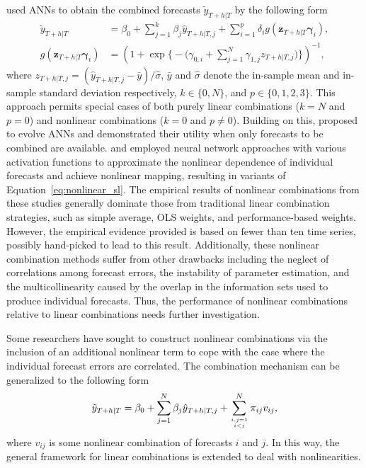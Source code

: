 \documentclass[11pt]{article}
\begin{document}
\citet{Donaldson1996-um} used ANNs to obtain the combined forecasts $\tilde{y}_{T+h|T}$ by the following form
\begin{align}
  \tilde{y}_{T+h|T} & =
    \beta_{0}+\sum_{j=1}^{k} \beta_{j} \hat{y}_{T+h|T, j}+\sum_{i=1}^{p} \delta_{i} g(\bm{z}_{T+h|T} \bm{\gamma}_{i}), \label{eq:nonlinear_sl} \\
  g(\bm{z}_{T+h|T} \bm{\gamma}_{i}) & =
    \left(1+\exp \bigg\{-\Big(\gamma_{0, i}+\sum_{j=1}^{N} \gamma_{1, j} z_{T+h|T, j}\Big)\bigg\}\right)^{-1}, 
\end{align}
where $z_{T+h|T, j} = (\hat{y}_{T+h|T, j}-\bar{y}) / \hat{\sigma}$, $\bar{y}$ and $\hat{\sigma}$ denote the in-sample mean and in-sample standard deviation respectively, $k \in \{0,N\}$, and $p \in \{0,1,2,3\}$. This approach permits special cases of both purely linear combinations ($k=N$ and $p=0$) and nonlinear combinations ($k=0$ and $p\neq 0$). Building on this, \citet{Harrald1997-gd} proposed to evolve ANNs and demonstrated their utility when only forecasts to be combined are available. \citet{Krasnopolsky2012-xu} and \citet{Babikir2016-xz} employed neural network approaches with various activation functions to approximate the nonlinear dependence of individual forecasts and achieve nonlinear mapping, resulting in variants of Equation~\eqref{eq:nonlinear_sl}. The empirical results of nonlinear combinations from these studies generally dominate those from traditional linear combination strategies, such as simple average, OLS weights, and performance-based weights. However, the empirical evidence provided is based on fewer than ten time series, possibly hand-picked to lead to this result. Additionally, these nonlinear combination methods suffer from other drawbacks including the neglect of correlations among forecast errors, the instability of parameter estimation, and the multicollinearity caused by the overlap in the information sets used to produce individual forecasts. Thus, the performance of nonlinear combinations relative to linear combinations needs further investigation.

Some researchers have sought to construct nonlinear combinations via the inclusion of an additional nonlinear term to cope with the case where the individual forecast errors are correlated. The combination mechanism can be generalized to the following form
\begin{align*}
  \tilde{y}_{T+h|T} =\beta_{0}+\sum_{j=1}^{N} \beta_{j} \hat{y}_{T+h|T, j}+\sum_{i,j=1 \atop i<j}^{N}\pi_{ij}v_{i j},
\end{align*}
where $v_{ij}$ is some nonlinear combination of forecasts $i$ and $j$. In this way, the general framework for linear combinations is extended to deal with nonlinearities.
\end{document}
